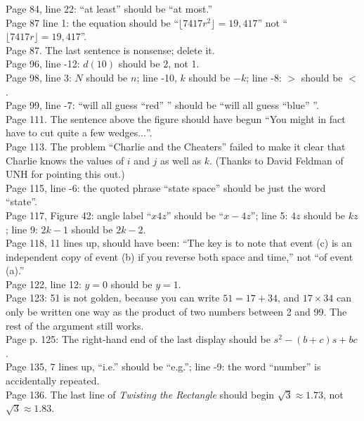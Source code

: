 \documentclass[11pt]{article}
\begin{document}
Page 84, line 22: ``at least'' should be ``at most.''\\

Page 87 line 1: the equation should be ``$\lfloor 7417r^2 \rfloor = 19,417$'' not
``$\lfloor 7417r \rfloor = 19,417$''. \\

Page 87.  The last sentence is nonsense; delete it.\\

Page 96, line -12: $d(10)$ should be 2, not 1.\\

Page 98, line 3: $N$ should be $n$; line -10, $k$ should be $-k$; line -8: $>$ should be $<$.\\

Page 99, line -7: ``will all guess ``red'' '' should be ``will all guess ``blue'' ''. \\

Page 111. The sentence above the figure should have begun ``You might in fact have to
cut quite a few wedges$\dots$''.\\

Page 113. The problem ``Charlie and the Cheaters'' failed to make it clear that Charlie knows
the values of $i$ and $j$ as well as $k$.  (Thanks to David Feldman of UNH for pointing this out.) \\

Page 115, line -6: the quoted phrase ``state space'' should be just the word ``state''. \\

Page 117, Figure 42: angle label ``$x4z$'' should be ``$x-4z$''; line 5: $4z$ should be $kz$;
line 9: $2k{-}1$ should be $2k{-}2$.\\

Page 118, 11 lines up, should have been: ``The key is to note that event (c) is an independent copy of event (b) if you reverse
both space and time,'' not ``of event (a).''\\

Page 122, line 12: $y=0$ should be $y=1$.\\

Page 123: 51 is not golden, because you can write $51=17+34$, and $17 \times 34$ can only be written one
way as the product of two numbers between 2 and 99.  The rest of the argument still works.\\

Page p. 125: The right-hand end of the last display should be $s^2-(b+c)s+bc$.\\

Page 135, 7 lines up,  ``i.e.'' should be ``e.g.'';
line -9: the word ``number'' is accidentally repeated.\\

Page 136. The last line of {\em Twisting the Rectangle} should begin $\sqrt{3}\approx 1.73$, not
$\sqrt{3}\approx 1.83$.
\end{document}

